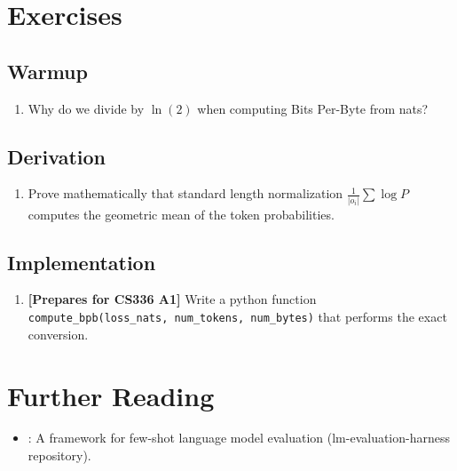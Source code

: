 \section{Exercises}
\label{ch:13:sec:exercises}

\subsection*{Warmup}
\begin{enumerate}
  \item Why do we divide by $\ln(2)$ when computing Bits Per-Byte from nats?
\end{enumerate}

\subsection*{Derivation}
\begin{enumerate}
  \item Prove mathematically that standard length normalization $\frac{1}{|o_i|}\sum \log P$ computes the geometric mean of the token probabilities.
\end{enumerate}

\subsection*{Implementation}
\begin{enumerate}
  \item \textbf{[Prepares for CS336 A1]} Write a python function \texttt{compute\_bpb(loss\_nats, num\_tokens, num\_bytes)} that performs the exact conversion.
\end{enumerate}

\section{Further Reading}
\label{ch:13:sec:further}

\begin{itemize}
  \item \textcite{gao2021}: A framework for few-shot language model evaluation (lm-evaluation-harness repository).
\end{itemize}
